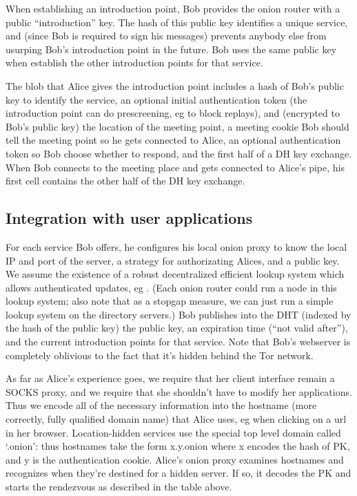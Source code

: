 \documentclass[times,10pt,twocolumn]{article}
\begin{document}
When establishing an introduction point, Bob provides the onion router
with a public ``introduction'' key.  The hash of this public key
identifies a unique service, and (since Bob is required to sign his
messages) prevents anybody else from usurping Bob's introduction point
in the future. Bob uses the same public key when establish the other
introduction points for that service.

The blob that Alice gives the introduction point includes a hash of Bob's
public key to identify the service, an optional initial authentication
token (the introduction point can do prescreening, eg to block replays),
and (encrypted to Bob's public key) the location of the meeting point,
a meeting cookie Bob should tell the meeting point so he gets connected to
Alice, an optional authentication token so Bob choose whether to respond,
and the first half of a DH key exchange. When Bob connects to the meeting
place and gets connected to Alice's pipe, his first cell contains the
other half of the DH key exchange.

\subsection{Integration with user applications}

For each service Bob offers, he configures his local onion proxy to know
the local IP and port of the server, a strategy for authorizating Alices,
and a public key. We assume the existence of a robust decentralized
efficient lookup system which allows authenticated updates, eg
\cite{cfs:sosp01}. (Each onion router could run a node in this lookup
system; also note that as a stopgap measure, we can just run a simple
lookup system on the directory servers.)  Bob publishes into the DHT
(indexed by the hash of the public key) the public key, an expiration
time (``not valid after''), and the current introduction points for that
service. Note that Bob's webserver is completely oblivious to the fact
that it's hidden behind the Tor network.

As far as Alice's experience goes, we require that her client interface
remain a SOCKS proxy, and we require that she shouldn't have to modify
her applications. Thus we encode all of the necessary information into
the hostname (more correctly, fully qualified domain name) that Alice
uses, eg when clicking on a url in her browser. Location-hidden services
use the special top level domain called `.onion': thus hostnames take the
form x.y.onion where x encodes the hash of PK, and y is the authentication
cookie. Alice's onion proxy examines hostnames and recognizes when they're
destined for a hidden server. If so, it decodes the PK and starts the
rendezvous as described in the table above.
\end{document}
